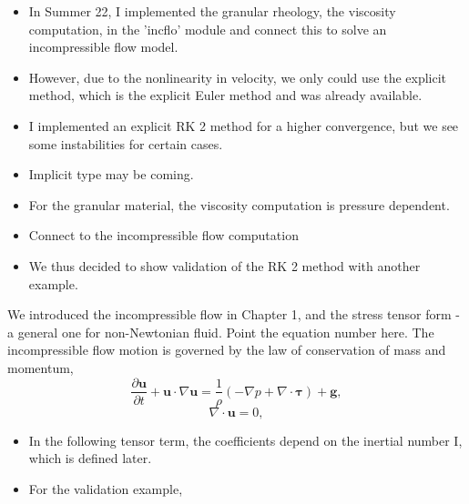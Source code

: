 \par
\begin{itemize}
  \item In Summer 22, I implemented the granular rheology, the viscosity computation, in the  'incflo' module and connect this to solve an incompressible flow model. 
  \item  However, due to the nonlinearity in velocity, we only could use the explicit method, which is the explicit Euler method and was already available.
  \item I implemented an explicit RK 2 method for a higher convergence, but we see some instabilities for certain cases.
  \item Implicit type may be coming. 
  \item For the granular material, the viscosity computation is pressure dependent. 
  \item Connect to the incompressible flow computation 

  
  \item We thus decided to show validation of the RK 2 method with another example.  
\end{itemize}


{\color{blue}We introduced the incompressible flow in Chapter 1, and the stress tensor form - a general one for non-Newtonian fluid. Point the equation number here.}
The incompressible flow motion is governed by the law of conservation of mass and momentum,
\begin{equation}
  \frac{\partial {\bm u}}{\partial t} 
  + {\bm u} \cdot \nabla {\bm u} = \frac{1}{\rho}
  \left( 
    -\nabla p + \nabla \cdot {\bm {\bm \tau}}\right) + {\bm g},
\end{equation}
\begin{equation}
  \nabla \cdot {\bm u} = 0,
\end{equation}
\begin{itemize}
  \item In the following tensor term, the coefficients depend on the inertial number I, which is defined later. 
  \item For the validation example, 
\end{itemize}
